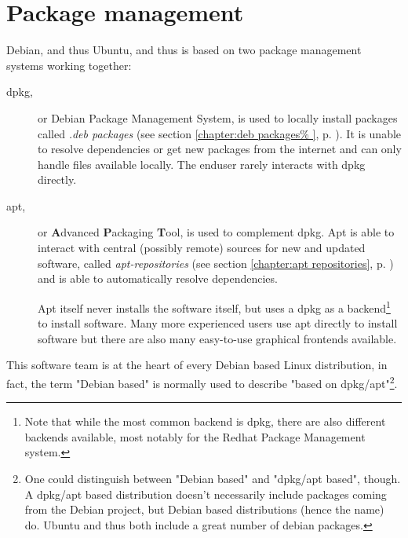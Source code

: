 
\chapter{Package management}
Debian, and thus Ubuntu, and thus \tunix{} is based on two package management
systems working together:
\begin{description}
  \item[dpkg,] or Debian Package Management System, is used to locally install
    packages called \emph{.deb packages} (see section \ref{chapter:deb packages%
    }, p. \pageref{chapter:deb packages}). It is unable to resolve dependencies
    or get new packages from the internet and can only handle files
    available locally. The enduser rarely interacts with dpkg directly.
  \item[apt,] or \textbf{A}dvanced \textbf{P}ackaging \textbf{T}ool, is used to
    complement dpkg. Apt is able to interact with central (possibly remote)
    sources for new and updated software, called \emph{apt-repositories} (see
    section \ref{chapter:apt repositories}, p. \pageref{chapter:apt %
    repositories}) and is able to automatically resolve dependencies.
    
    Apt itself never installs the software itself, but uses a
    dpkg as a backend\footnote{Note that while the most common backend is dpkg,
    there are also different backends available, most notably for the Redhat
    Package Management system.} to install software. Many more experienced
    users use apt directly to install software but there are also many
    easy-to-use graphical frontends available.
\end{description}
This software team is at the heart of every Debian based Linux distribution,
in fact, the term "Debian based" is normally used to describe "based on
dpkg/apt"\footnote{One could distinguish between "Debian based" and "dpkg/apt
based", though. A dpkg/apt based distribution doesn't necessarily include
packages coming from the Debian project, but Debian based distributions (hence
the name) do. Ubuntu and thus \tunix{} both include a great number of debian
packages.}.

